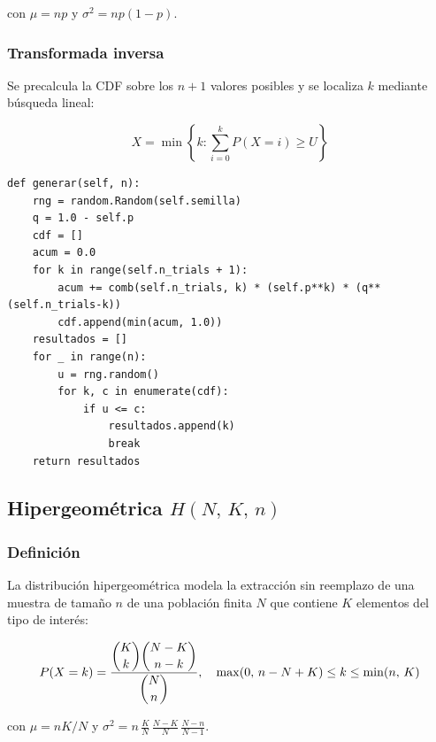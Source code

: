 \documentclass[a4paper, 11pt]{article}
\begin{document}
con $\mu = np$ y $\sigma^2 = np(1-p)$.

\subsubsection*{Transformada inversa}

Se precalcula la CDF sobre los $n+1$ valores posibles y se localiza $k$ mediante
búsqueda lineal:

\begin{equation}
  X = \min\left\{k : \sum_{i=0}^{k} P(X=i) \geq U\right\}
  \label{eq:binom_inv}
\end{equation}

\begin{lstlisting}[style=python, caption={Generador Binomial — transformada inversa con CDF precalculada.}]
def generar(self, n):
    rng = random.Random(self.semilla)
    q = 1.0 - self.p
    cdf = []
    acum = 0.0
    for k in range(self.n_trials + 1):
        acum += comb(self.n_trials, k) * (self.p**k) * (q**(self.n_trials-k))
        cdf.append(min(acum, 1.0))
    resultados = []
    for _ in range(n):
        u = rng.random()
        for k, c in enumerate(cdf):
            if u <= c:
                resultados.append(k)
                break
    return resultados
\end{lstlisting}


\subsection{Hipergeométrica \texorpdfstring{$H(N,\,K,\,n)$}{H(N,K,n)}}

\subsubsection*{Definición}

La distribución hipergeométrica modela la extracción sin reemplazo de una
muestra de tamaño $n$ de una población finita $N$ que contiene $K$ elementos
del tipo de interés:

\begin{equation}
  P(X = k) = \frac{\dbinom{K}{k}\dbinom{N-K}{n-k}}{\dbinom{N}{n}},
  \quad \max(0,\,n-N+K) \leq k \leq \min(n,\,K)
  \label{eq:hiper_pmf}
\end{equation}

con $\mu = nK/N$ y $\sigma^2 = n\,\frac{K}{N}\,\frac{N-K}{N}\,\frac{N-n}{N-1}$.
\end{document}
